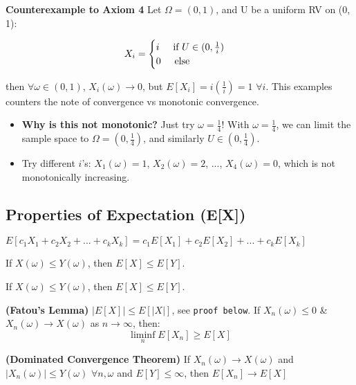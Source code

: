 \begin{exmp}\textbf{Counterexample to Axiom 4}
    Let $\Omega = (0, 1)$, and U be a uniform RV on (0, 1):

    \begin{equation*}
        X_i = \begin{cases}
            i \hspace{0.5cm} \text{if } U\in (0,\frac{1}{i}) \\
            0 \hspace{0.5cm} \text{else}
        \end{cases}
    \end{equation*}
    
    then $\forall \omega \in (0,1)$, $X_i(\omega) \rightarrow 0$, but $E[X_i] = i(\frac{1}{i}) = 1$ $\forall i$. This examples counters the note of convergence vs monotonic convergence.
\end{exmp}
      
\begin{itemize}
    \item \textbf{Why is this not monotonic?} Just try $\omega = \frac{1}{4}$! With $\omega = \frac{1}{4}$, we can limit the sample space to $\Omega = (0, \frac{1}{4})$, and similarly $U \in (0, \frac{1}{4})$. 
    \item Try different $i$'s: $X_1(\omega) = 1$, $X_2(\omega) = 2$, ..., $X_4(\omega) = 0$, which is not monotonically increasing.
\end{itemize}

\subsection{Properties of Expectation (E[X])}

\begin{ppty}
    $E[c_1X_1 + c_2X_2 + ... + c_kX_k] = c_1E[X_1] + c_2E[X_2] + ... + c_kE[X_k]$
\end{ppty}
\begin{ppty}
    If $X(\omega) \leq Y(\omega)$, then $E[X] \leq E[Y]$.
\end{ppty}
\begin{ppty}
    If $X(\omega) \leq Y(\omega)$, then $E[X] \leq E[Y]$.
\end{ppty}
\begin{ppty}\textbf{(Fatou's Lemma)} 
    $\big|E[X]\big| \leq E[|X|]$, see \texttt{proof below}. If $X_n(\omega) \leq 0$ \& $X_n(\omega) \rightarrow X(\omega)$ as $n \rightarrow \infty$, then:
    \begin{equation*}
        \liminf_{n}E[X_n] \geq E[X]
    \end{equation*}
\end{ppty}
\begin{ppty} \textbf{(Dominated Convergence Theorem)}
    If $X_n(\omega) \rightarrow X(\omega)$ and $|X_n(\omega)| \leq Y(\omega)$ $\forall n, \omega$ and $E[Y] \leq \infty$, then $E[X_n] \rightarrow E[X]$
\end{ppty}
